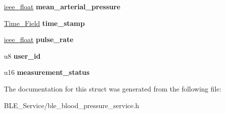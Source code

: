 \begin{DoxyCompactItemize}
\item 
\hyperlink{structieee__float}{ieee\+\_\+float} {\bfseries mean\+\_\+arterial\+\_\+pressure}\hypertarget{struct_b_l_e___b_p_s___cuff___pressure_a607ba71f8ea2dfbd17e76e57de43d97e}{}\label{struct_b_l_e___b_p_s___cuff___pressure_a607ba71f8ea2dfbd17e76e57de43d97e}

\item 
\hyperlink{struct_time___field}{Time\+\_\+\+Field} {\bfseries time\+\_\+stamp}\hypertarget{struct_b_l_e___b_p_s___cuff___pressure_ad458017ce5b6a69bad0a1085c861b958}{}\label{struct_b_l_e___b_p_s___cuff___pressure_ad458017ce5b6a69bad0a1085c861b958}

\item 
\hyperlink{structieee__float}{ieee\+\_\+float} {\bfseries pulse\+\_\+rate}\hypertarget{struct_b_l_e___b_p_s___cuff___pressure_a4194b14cee9ac792d37872c146679007}{}\label{struct_b_l_e___b_p_s___cuff___pressure_a4194b14cee9ac792d37872c146679007}

\item 
u8 {\bfseries user\+\_\+id}\hypertarget{struct_b_l_e___b_p_s___cuff___pressure_a9cdd631be825ed15d051ededa709bd69}{}\label{struct_b_l_e___b_p_s___cuff___pressure_a9cdd631be825ed15d051ededa709bd69}

\item 
u16 {\bfseries measurement\+\_\+status}\hypertarget{struct_b_l_e___b_p_s___cuff___pressure_ad324ed7de2bccf9f01e14ebfd2d134cf}{}\label{struct_b_l_e___b_p_s___cuff___pressure_ad324ed7de2bccf9f01e14ebfd2d134cf}

\end{DoxyCompactItemize}


The documentation for this struct was generated from the following file\+:\begin{DoxyCompactItemize}
\item 
B\+L\+E\+\_\+\+Service/ble\+\_\+blood\+\_\+pressure\+\_\+service.\+h\end{DoxyCompactItemize}
